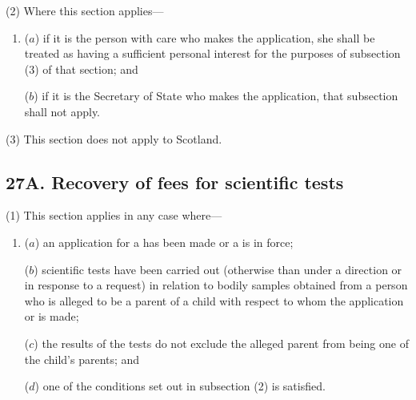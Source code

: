 \documentclass[a4paper]{article}
\begin{document}
(2) Where this section applies---
\begin{enumerate}\item[]
($a$) if it is the person with care who makes the application, she shall be treated as having a sufficient personal interest for the purposes of subsection (3) of that section; and

($b$) if it is the Secretary of State who makes the application, that subsection shall not apply.
\end{enumerate}

(3) This section does not apply to Scotland.


\subsection{27A. Recovery of fees for scientific tests}

(1) This section applies in any case where---
\begin{enumerate}\item[]
($a$) an application for a  has been made or a  is in force;

($b$)
scientific tests have been carried out (otherwise than under a direction or in response to a request) in relation to bodily samples obtained from a person who is alleged to be a parent of a child with respect to whom the application or  is made;

($c$)
the results of the tests do not exclude the alleged parent from being one of the child’s parents; and

($d$)
one of the conditions set out in subsection (2) is satisfied.
\end{enumerate}
\end{document}

